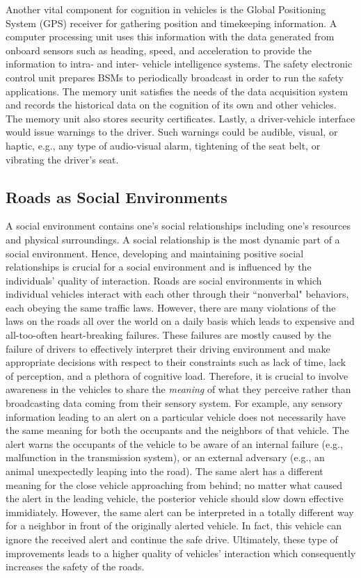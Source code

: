 \documentclass[journal, 11pt]{IEEEtran}
\begin{document}
Another vital component for cognition in vehicles is the Global Positioning
System (GPS) receiver for gathering position and timekeeping information. A
computer processing unit uses this information with the data generated from
onboard sensors such as heading, speed, and acceleration to provide the
information to intra- and inter- vehicle intelligence systems. The safety
electronic control unit prepares BSMs to periodically broadcast in order to run
the safety applications. The memory unit satisfies the needs of the data
acquisition system and records the historical data on the cognition of its
own and other vehicles. The memory unit also stores security certificates.
Lastly, a driver-vehicle interface would issue warnings to the driver. Such
warnings could be audible, visual, or haptic, e.g., any type of audio-visual
alarm, tightening of the seat belt, or vibrating the driver's seat.

\subsection{Roads as Social Environments}

A social environment contains one's social relationships including one's
resources and physical surroundings. A social relationship is the most dynamic
part of a social environment. Hence, developing and maintaining positive social
relationships is crucial for a social environment and is influenced by the
individuals' quality of interaction. Roads are social environments in which
individual vehicles interact with each other through their ``nonverbal"
behaviors, each obeying the same traffic laws. However, there are many
violations of the laws on the roads all over the world on a daily basis which
leads to expensive and all-too-often heart-breaking failures. These failures are
mostly caused by the failure of drivers to effectively interpret their driving
environment and make appropriate decisions with respect to their constraints
such as lack of time, lack of perception, and a plethora of cognitive load.
Therefore, it is crucial to involve awareness in the vehicles to share the
\textit{meaning} of what they perceive rather than broadcasting data coming
from their sensory system. For example, any sensory information leading to an
alert on a particular vehicle does not necessarily have the same meaning for
both the occupants and the neighbors of that vehicle. The alert warns the
occupants of the vehicle to be aware of an internal failure (e.g., malfunction
in the transmission system), or an external adversary (e.g., an animal
unexpectedly leaping into the road). The same alert has a different meaning
for the close vehicle approaching from behind; no matter what caused the alert
in the leading vehicle, the posterior vehicle should slow down effective
immidiately. However, the same alert can be interpreted in a totally different
way for a neighbor in front of the originally alerted vehicle. In fact, this
vehicle can ignore the received alert and continue the safe drive. Ultimately,
these type of improvements leads to a higher quality of vehicles' interaction
which consequently increases the safety of the roads.
\end{document}
